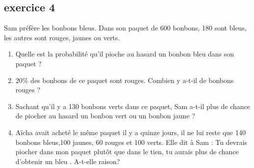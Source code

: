 \documentclass[11pt]{article}
\begin{document}
\begin{multicols}{2}
  \subsection*{exercice 4}
  Sam préfère les bonbons bleus. 
  Dans son paquet de 600 bonbons, 180 sont bleus, les autres sont rouges, jaunes ou verts.

  \begin{enumerate}
  \item Quelle est la probabilité qu’il pioche au hasard un bonbon bleu dans son paquet ?
  \item 20\% des bonbons de ce paquet sont rouges. Combien y a-t-il de bonbons rouges ?
  \item Sachant qu’il y a 130 bonbons verts dans ce paquet, Sam a-t-il plus de chance de piocher au hasard un bonbon vert ou un bonbon jaune ?
  \item Aïcha avait acheté le même paquet il y a quinze jours, il ne lui reste que 140 bonbons bleus,100 jaunes, 60 rouges et 100 verts. Elle dit à Sam : \og Tu devrais piocher dans mon paquet plutôt que dans le tien, tu aurais plus de chance d’obtenir un bleu \fg.
    A-t-elle raison? 
  \end{enumerate}
\end{multicols}
\end{document}

